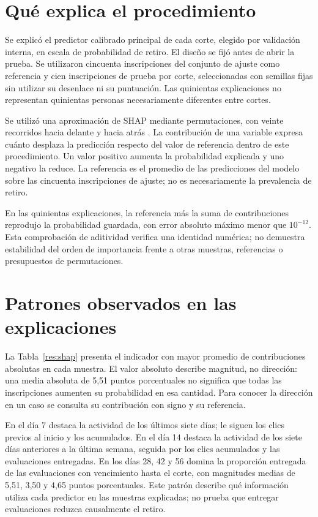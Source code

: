 \section{Qué explica el procedimiento}
Se explicó el predictor calibrado principal de cada corte, elegido por validación interna, en escala de probabilidad de retiro. El diseño se fijó antes de abrir la prueba. Se utilizaron cincuenta inscripciones del conjunto de ajuste como referencia y cien inscripciones de prueba por corte, seleccionadas con semillas fijas sin utilizar su desenlace ni su puntuación. Las quinientas explicaciones no representan quinientas personas necesariamente diferentes entre cortes.

Se utilizó una aproximación de SHAP mediante permutaciones, con veinte recorridos hacia delante y hacia atrás \cite{modelosshappermutation2026}. La contribución de una variable expresa cuánto desplaza la predicción respecto del valor de referencia dentro de este procedimiento. Un valor positivo aumenta la probabilidad explicada y uno negativo la reduce. La referencia es el promedio de las predicciones del modelo sobre las cincuenta inscripciones de ajuste; no es necesariamente la prevalencia de retiro.

En las quinientas explicaciones, la referencia más la suma de contribuciones reprodujo la probabilidad guardada, con error absoluto máximo menor que $10^{-12}$. Esta comprobación de aditividad verifica una identidad numérica; no demuestra estabilidad del orden de importancia frente a otras muestras, referencias o presupuestos de permutaciones.

\section{Patrones observados en las explicaciones}
La Tabla~\ref{res:shap} presenta el indicador con mayor promedio de contribuciones absolutas en cada muestra. El valor absoluto describe magnitud, no dirección: una media absoluta de 5,51 puntos porcentuales no significa que todas las inscripciones aumenten su probabilidad en esa cantidad. Para conocer la dirección en un caso se consulta su contribución con signo y su referencia.


En el día 7 destaca la actividad de los últimos siete días; le siguen los clics previos al inicio y los acumulados. En el día 14 destaca la actividad de los siete días anteriores a la última semana, seguida por los clics acumulados y las evaluaciones entregadas. En los días 28, 42 y 56 domina la proporción entregada de las evaluaciones con vencimiento hasta el corte, con magnitudes medias de 5,51, 3,50 y 4,65 puntos porcentuales. Este patrón describe qué información utiliza cada predictor en las muestras explicadas; no prueba que entregar evaluaciones reduzca causalmente el retiro.

